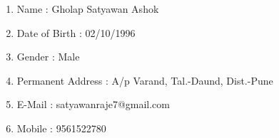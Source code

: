 \documentclass[11pt,fleqn]{book} %
\begin{document}
\newpage
\begin{enumerate}
\begingroup
\thispagestyle{empty}
\par\normalfont\fontsize{20}{15}\sffamily\selectfont\color{white}
\vspace*{2cm}
    \item Name : Gholap Satyawan Ashok\\[0.5cm]
    \item Date of Birth : 02/10/1996\\[0.5cm]
    \item Gender : Male\\[0.5cm] 
    \item Permanent Address : A/p Varand, Tal.-Daund, Dist.-Pune\\[0.5cm]
    \item E-Mail : satyawanraje7@gmail.com\\[0.5cm]
    \item Mobile : 9561522780
\end{enumerate}
\endgroup
\end{document}
